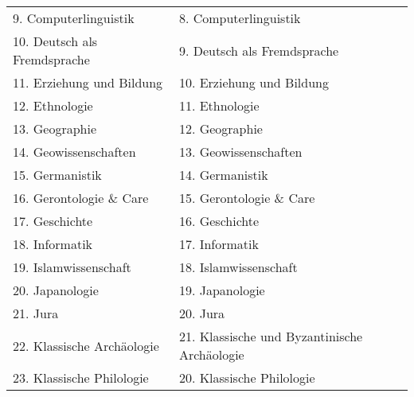 {\begin{longtable}{|p{7.5cm}|p{7.5cm}|}
        9. Computerlinguistik                                            & 8. Computerlinguistik                                            \\
        10. Deutsch als Fremdsprache                                     & 9. Deutsch als Fremdsprache                                      \\
        11. Erziehung und Bildung                                        & 10. Erziehung und Bildung                                        \\
        12. Ethnologie                                                   & 11. Ethnologie                                                   \\
        13. Geographie                                                   & 12. Geographie                                                   \\
        14. Geowissenschaften                                            & 13. Geowissenschaften                                            \\
        15. Germanistik                                                  & 14. Germanistik                                                  \\
        16. Gerontologie \& Care                                         & 15. Gerontologie \& Care                                         \\
        17. Geschichte                                                   & 16. Geschichte                                                   \\
        18. Informatik                                                   & 17. Informatik                                                   \\
        19. Islamwissenschaft                                            & 18. Islamwissenschaft                                            \\
        20. Japanologie                                                  & 19. Japanologie                                                  \\
        21. Jura                                                         & 20. Jura                                                         \\
        22. Klassische Archäologie                                       & 21. Klassische und Byzantinische Archäologie                     \\
        23. Klassische Philologie                                        & 20. Klassische Philologie                                        \\

\end{longtable}}
